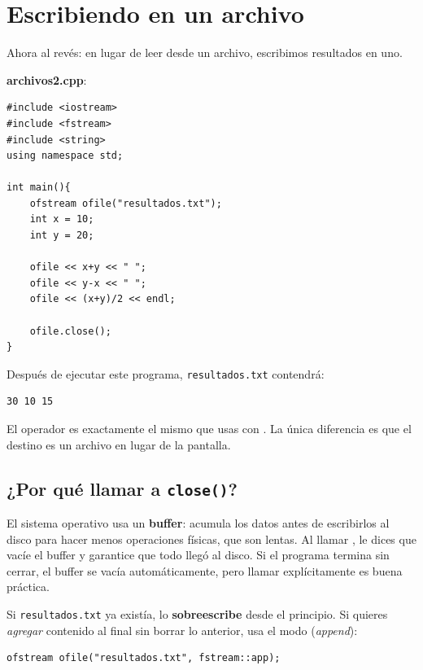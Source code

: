\documentclass[12pt, oneside]{article}
\begin{document}
\section{Escribiendo en un archivo}

Ahora al revés: en lugar de leer desde un archivo, escribimos resultados en uno.

\textbf{archivos2.cpp}:
\begin{verbatim}
#include <iostream>
#include <fstream>
#include <string>
using namespace std;

int main(){
    ofstream ofile("resultados.txt");
    int x = 10;
    int y = 20;

    ofile << x+y << " ";
    ofile << y-x << " ";
    ofile << (x+y)/2 << endl;

    ofile.close();
}
\end{verbatim}

Después de ejecutar este programa, \texttt{resultados.txt} contendrá:
\begin{verbatim}
30 10 15
\end{verbatim}

El operador \cpp{<<} es exactamente el mismo que usas con .  La
única diferencia es que el destino es un archivo en lugar de la pantalla.

\subsection{¿Por qué llamar a \texttt{close()}?}

El sistema operativo usa un \textbf{buffer}: acumula los datos antes de
escribirlos al disco para hacer menos operaciones físicas, que son lentas.
Al llamar , le dices que vacíe el buffer y garantice que todo
llegó al disco.  Si el programa termina sin cerrar, el buffer se vacía
automáticamente, pero llamar  explícitamente es buena práctica.

\begin{recuerda}
  Si \texttt{resultados.txt} ya existía,  lo
  \textbf{sobreescribe} desde el principio.  Si quieres \textit{agregar}
  contenido al final sin borrar lo anterior, usa el modo 
  (\textit{append}):
  \begin{verbatim}
ofstream ofile("resultados.txt", fstream::app);
  \end{verbatim}
\end{recuerda}
\end{document}
